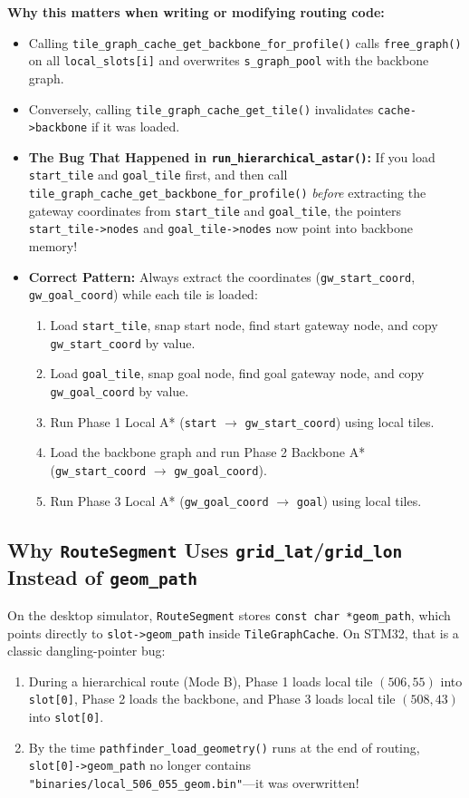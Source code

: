 \documentclass[11pt,a4paper]{article}
\begin{document}
\textbf{Why this matters when writing or modifying routing code:}
\begin{itemize}
    \item Calling \texttt{tile\_graph\_cache\_get\_backbone\_for\_profile()} calls \texttt{free\_graph()} on all \texttt{local\_slots[i]} and overwrites \texttt{s\_graph\_pool} with the backbone graph.
    \item Conversely, calling \texttt{tile\_graph\_cache\_get\_tile()} invalidates \texttt{cache->backbone} if it was loaded.
    \item \textbf{The Bug That Happened in \texttt{run\_hierarchical\_astar()}:} If you load \texttt{start\_tile} and \texttt{goal\_tile} first, and then call \texttt{tile\_graph\_cache\_get\_backbone\_for\_profile()} \emph{before} extracting the gateway coordinates from \texttt{start\_tile} and \texttt{goal\_tile}, the pointers \texttt{start\_tile->nodes} and \texttt{goal\_tile->nodes} now point into backbone memory!
    \item \textbf{Correct Pattern:} Always extract the coordinates (\texttt{gw\_start\_coord}, \texttt{gw\_goal\_coord}) while each tile is loaded:
    \begin{enumerate}
        \item Load \texttt{start\_tile}, snap start node, find start gateway node, and copy \texttt{gw\_start\_coord} by value.
        \item Load \texttt{goal\_tile}, snap goal node, find goal gateway node, and copy \texttt{gw\_goal\_coord} by value.
        \item Run Phase 1 Local A* (\texttt{start} $\to$ \texttt{gw\_start\_coord}) using local tiles.
        \item Load the backbone graph and run Phase 2 Backbone A* (\texttt{gw\_start\_coord} $\to$ \texttt{gw\_goal\_coord}).
        \item Run Phase 3 Local A* (\texttt{gw\_goal\_coord} $\to$ \texttt{goal}) using local tiles.
    \end{enumerate}
\end{itemize}

\subsection{Why \texttt{RouteSegment} Uses \texttt{grid\_lat}/\texttt{grid\_lon} Instead of \texttt{geom\_path}}

On the desktop simulator, \texttt{RouteSegment} stores \texttt{const char *geom\_path}, which points directly to \texttt{slot->geom\_path} inside \texttt{TileGraphCache}. On STM32, that is a classic dangling-pointer bug:
\begin{enumerate}
    \item During a hierarchical route (Mode B), Phase 1 loads local tile $(506, 55)$ into \texttt{slot[0]}, Phase 2 loads the backbone, and Phase 3 loads local tile $(508, 43)$ into \texttt{slot[0]}.
    \item By the time \texttt{pathfinder\_load\_geometry()} runs at the end of routing, \texttt{slot[0]->geom\_path} no longer contains \texttt{"binaries/local\_506\_055\_geom.bin"}---it was overwritten!
\end{enumerate}
\end{document}
